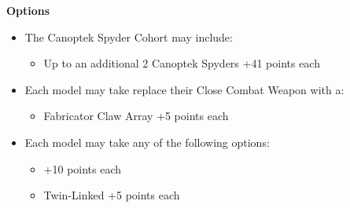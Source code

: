 \begin{minipage}[t]{0.72\textwidth}
	
	\vspace*{2em}
	\textbf{Options}
	\begin{itemize}
		\item The Canoptek Spyder Cohort may include:
		\begin{itemize}
			\item Up to an additional 2 Canoptek Spyders \dotfill +41 points each
		\end{itemize}
		\item Each model may take replace their Close Combat Weapon with a:
		\begin{itemize}
			\item Fabricator Claw Array \dotfill +5 points each
		\end{itemize}
		\item Each model may take any of the following options:
		\begin{itemize}
		\item {} \dotfill +10 points each
		\item Twin-Linked  \dotfill +5 points each
		\end{itemize}
	\end{itemize}
\end{minipage}


\newpage
